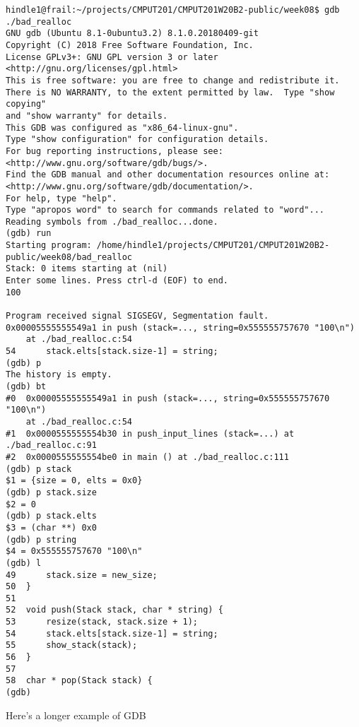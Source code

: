 \documentclass[11pt]{article}
\begin{document}
\begin{verbatim}
hindle1@frail:~/projects/CMPUT201/CMPUT201W20B2-public/week08$ gdb ./bad_realloc 
GNU gdb (Ubuntu 8.1-0ubuntu3.2) 8.1.0.20180409-git
Copyright (C) 2018 Free Software Foundation, Inc.
License GPLv3+: GNU GPL version 3 or later <http://gnu.org/licenses/gpl.html>
This is free software: you are free to change and redistribute it.
There is NO WARRANTY, to the extent permitted by law.  Type "show copying"
and "show warranty" for details.
This GDB was configured as "x86_64-linux-gnu".
Type "show configuration" for configuration details.
For bug reporting instructions, please see:
<http://www.gnu.org/software/gdb/bugs/>.
Find the GDB manual and other documentation resources online at:
<http://www.gnu.org/software/gdb/documentation/>.
For help, type "help".
Type "apropos word" to search for commands related to "word"...
Reading symbols from ./bad_realloc...done.
(gdb) run
Starting program: /home/hindle1/projects/CMPUT201/CMPUT201W20B2-public/week08/bad_realloc 
Stack: 0 items starting at (nil)
Enter some lines. Press ctrl-d (EOF) to end.
100

Program received signal SIGSEGV, Segmentation fault.
0x00005555555549a1 in push (stack=..., string=0x555555757670 "100\n")
    at ./bad_realloc.c:54
54	    stack.elts[stack.size-1] = string;
(gdb) p
The history is empty.
(gdb) bt
#0  0x00005555555549a1 in push (stack=..., string=0x555555757670 "100\n")
    at ./bad_realloc.c:54
#1  0x0000555555554b30 in push_input_lines (stack=...) at ./bad_realloc.c:91
#2  0x0000555555554be0 in main () at ./bad_realloc.c:111
(gdb) p stack
$1 = {size = 0, elts = 0x0}
(gdb) p stack.size
$2 = 0
(gdb) p stack.elts
$3 = (char **) 0x0
(gdb) p string
$4 = 0x555555757670 "100\n"
(gdb) l
49	    stack.size = new_size;
50	}
51	
52	void push(Stack stack, char * string) {
53	    resize(stack, stack.size + 1);
54	    stack.elts[stack.size-1] = string;
55	    show_stack(stack);
56	}
57	
58	char * pop(Stack stack) {
(gdb) 
\end{verbatim}

Here's a longer example of GDB
\end{document}
